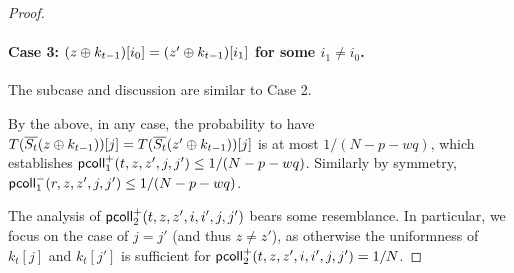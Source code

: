 \documentclass[journal=tosc,final,nohyperref]{iacrtrans}
\begin{document}
\begin{proof}
	
	
	
	\paragraph{Case 3: $(z\oplus k_{t-1})[i_0]=(z'\oplus k_{t-1})[i_1]$ for some $i_1\neq i_0$.}
	
	The subcase and discussion are similar to Case 2.
	
	
	
	\arrangespace
	
	
	By the above, in any case, the probability to have $T(\overline{S_t}(z\oplus k_{t-1}))[j]=T(\overline{S_t}(z'\oplus k_{t-1}))[j]$ is at most $1/(N-p-wq)$, which establishes $\mathsf{pcoll}_{1}^+(t,z,z',j,j')\leq1/(N-p-wq)$. Similarly by symmetry, $\mathsf{pcoll}_{1}^-(r,z,z',j,j')\leq1/(N-p-wq)$.
	
	
	
	
	\arrangespace
	
	
	The analysis of $\mathsf{pcoll}_{2}^+(t,z,z',i,i',j,j')$ bears some resemblance. In particular, we focus on the case of $j=j'$ (and thus $z\neq z'$), as otherwise the uniformness of $k_t[j]$ and $k_t[j']$ is sufficient for $\mathsf{pcoll}_{2}^+(t,z,z',i,i',j,j')=1/N$.
	

\end{proof}
\end{document}
